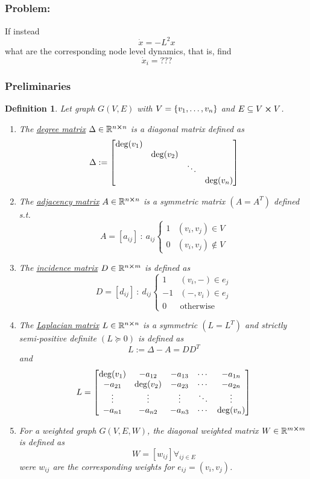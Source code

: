 \documentclass[]{article}
\numberwithin{equation}{section}
\newcommand{\R}{\mathbb{R}}
\newcommand{\st}{\ : \ }
\newtheorem{definition}{Definition}
\begin{document}
\subsection{}
\subsubsection*{Problem:}
If instead\[
    \dot{x} = - L^2 x
\] what are the corresponding node level dynamics, that is, find \[
    \dot{x}_i = ???
\]
\subsubsection*{Preliminaries}
\begin{definition} \label{def:graph_matrices}
	Let graph $G(V,E)$ with $V = \qty{v_1,\dots,v_n}$ and $E \subseteq V \cross V$.
	\begin{enumerate}
		\item The \underline{\emph{degree matrix}} $\Delta \in \R^{n\cross n}$ is a diagonal matrix defined as \[
			\Delta := \mqty[\dmat{\deg(v_1), \deg(v_2), \ddots, \deg(v_n)}]
		\]
		\item The \emph{\underline{adjacency matrix}} $A \in \R^{n\cross n}$ is a symmetric matrix $(A = A^T)$ defined s.t. \[
			A = [a_{ij}] \st a_{ij} \begin{cases}
				1 &(v_i,v_j) \in V\\
				0 &(v_i,v_j) \notin V
			\end{cases}
		\]
		\item The \emph{\underline{incidence matrix}} $D \in \R^{n \cross m}$ is defined as\[
			D = [d_{ij}] \st d_{ij} \begin{cases}
				1 	&(v_i,-) \in e_{j}\\
				-1	&(-,v_i) \in e_{j}\\
				0	&\text{otherwise}
			\end{cases}
		\]
		\item The \emph{\underline{Laplacian matrix}} $L \in \R^{n \cross n}$ is a symmetric $(L = L^T)$ and strictly semi-positive definite $(L \succeq 0)$ is defined as\[
			L := \Delta - A = D D^T
		\]and\[
			L = \mqty[
				\deg(v_1)	&-a_{12}	&-a_{13}	&\cdots	&-a_{1n}\\
				-a_{21}		&\deg(v_2)	&-a_{23}	&\cdots	&-a_{2n}\\
				\vdots		&\vdots		&\vdots		&\ddots	&\vdots\\
				-a_{n1}		&-a_{n2}	&-a_{n3}	&\cdots	&\deg(v_n)
			]
		\]
		\item For a weighted graph $G(V,E,W)$, the diagonal weighted matrix $W\in \R^{m\cross m}$ is defined as\[
			W = [w_{ij}] \forall_{ij \in E}
		\]
		were $w_{ij}$ are the corresponding weights for $e_{ij} = (v_i,v_j)$.
	\end{enumerate}
\end{definition}
\end{document}
